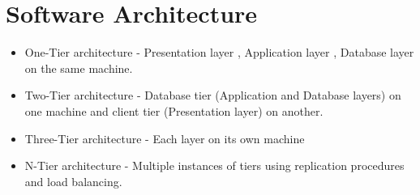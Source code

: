 \documentclass[12pt letter]{report}
\begin{document}
\section{Software Architecture}





\begin{itemize}
  \item One-Tier architecture -  Presentation layer , Application layer , Database layer on the same machine.
  \item  Two-Tier architecture - Database tier (Application and Database layers) on one machine and client tier
        (Presentation layer) on another.
  \item Three-Tier architecture - Each layer on its own machine
  \item N-Tier architecture - Multiple instances of tiers using replication procedures and load balancing.
\end{itemize}
\end{document}
